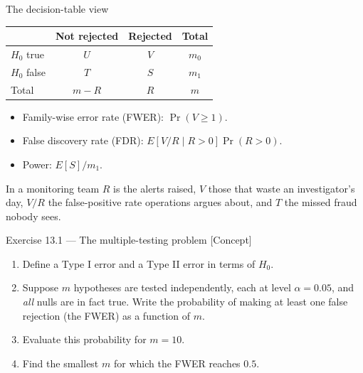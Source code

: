 \documentclass[aspectratio=169,11pt]{beamer}
\begin{document}
\begin{frame}{The decision-table view}
  \begin{center}
  \begin{tabular}{l|cc|c}
    \toprule
            & Not rejected & Rejected & Total \\
    \midrule
    $H_0$ true   & $U$ & $V$ & $m_0$ \\
    $H_0$ false  & $T$ & $S$ & $m_1$ \\
    \midrule
    Total & $m - R$ & $R$ & $m$ \\
    \bottomrule
  \end{tabular}
  \end{center}
  \begin{readme}
    \begin{itemize}
      \item Family-wise error rate (FWER): $\Pr(V \ge 1)$.
      \item False discovery rate (FDR): $E[V/R \mid R > 0]\Pr(R > 0)$.
      \item Power: $E[S]/m_1$.
    \end{itemize}
  \end{readme}
  \begin{industry}
    In a monitoring team $R$ is the alerts raised, $V$ those that waste an investigator's
    day, $V/R$ the false-positive rate operations argues about, and $T$ the missed fraud
    nobody sees.
  \end{industry}
\end{frame}



\begin{frame}{Exercise 13.1 --- The multiple-testing problem [Concept]}
\begin{exercise}
  \begin{enumerate}
    \item Define a Type I error and a Type II error in terms of $H_0$.
    \item Suppose $m$ hypotheses are tested independently, each at
          level $\alpha = 0.05$, and \emph{all} nulls are in fact
          true. Write the probability of making at least one false
          rejection (the FWER) as a function of $m$.
    \item Evaluate this probability for $m = 10$.
    \item Find the smallest $m$ for which the FWER reaches $0.5$.
  \end{enumerate}
\end{exercise}
\end{frame}
\end{document}
